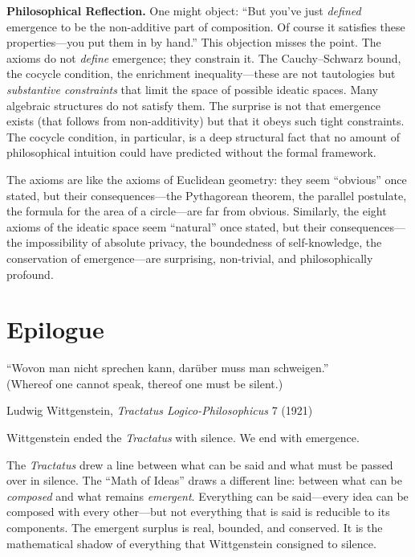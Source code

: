 \begin{reflectionbox}
\noindent\textbf{Philosophical Reflection.}
One might object: ``But you've just \emph{defined} emergence to be the
non-additive part of composition.  Of course it satisfies these properties---you
put them in by hand.''  This objection misses the point.  The axioms do not
\emph{define} emergence; they constrain it.  The Cauchy--Schwarz bound, the
cocycle condition, the enrichment inequality---these are not tautologies but
\emph{substantive constraints} that limit the space of possible ideatic spaces.
Many algebraic structures do not satisfy them.  The surprise is not that
emergence exists (that follows from non-additivity) but that it obeys such
tight constraints.  The cocycle condition, in particular, is a deep structural
fact that no amount of philosophical intuition could have predicted without the
formal framework.

The axioms are like the axioms of Euclidean geometry: they seem ``obvious''
once stated, but their consequences---the Pythagorean theorem, the parallel
postulate, the formula for the area of a circle---are far from obvious.
Similarly, the eight axioms of the ideatic space seem ``natural'' once
stated, but their consequences---the impossibility of absolute privacy, the
boundedness of self-knowledge, the conservation of emergence---are
surprising, non-trivial, and philosophically profound.
\end{reflectionbox}

\section{Epilogue}

\epigraph{``Wovon man nicht sprechen kann, dar\"uber muss man schweigen.''\\[4pt]
\textnormal{(Whereof one cannot speak, thereof one must be silent.)}}{Ludwig
Wittgenstein, \textit{Tractatus Logico-Philosophicus} 7 (1921)}

\medskip

Wittgenstein ended the \textit{Tractatus} with silence.  We end with
emergence.

The \textit{Tractatus} drew a line between what can be said and what must
be passed over in silence.  The ``Math of Ideas'' draws a different line:
between what can be \emph{composed} and what remains \emph{emergent}.
Everything can be said---every idea can be composed with every other---but
not everything that is said is reducible to its components.  The emergent
surplus is real, bounded, and conserved.  It is the mathematical shadow of
everything that Wittgenstein consigned to silence.

